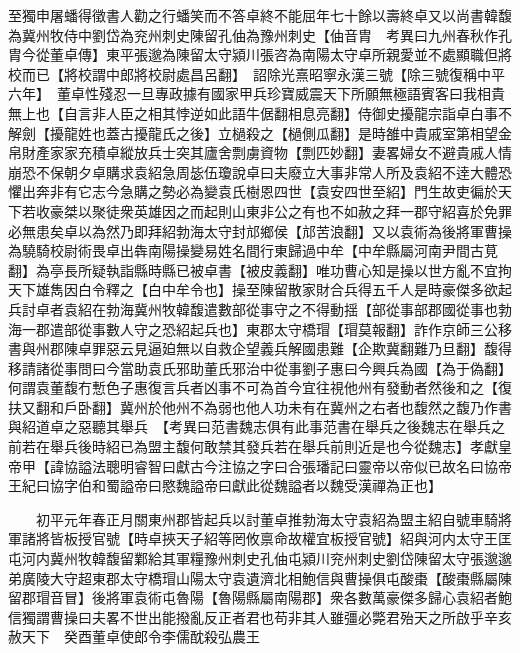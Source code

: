 至獨申屠蟠得徵書人勸之行蟠笑而不答卓終不能屈年七十餘以壽終卓又以尚書韓馥為冀州牧侍中劉岱為兖州刺史陳留孔伷為豫州刺史【伷音胄　考異曰九州春秋作孔胄今從董卓傳】東平張邈為陳留太守潁川張咨為南陽太守卓所親愛並不處顯職但將校而已【將校謂中郎將校尉處昌呂翻】　詔除光熹昭寧永漢三號【除三號復稱中平六年】　董卓性殘忍一旦專政據有國家甲兵珍寶威震天下所願無極語賓客曰我相貴無上也【自言非人臣之相其悖逆如此語牛倨翻相息亮翻】侍御史擾龍宗詣卓白事不解劍【擾龍姓也蓋古擾龍氏之後】立檛殺之【檛側瓜翻】是時雒中貴戚室第相望金帛財產家家充積卓縱放兵士突其廬舍剽虜資物【剽匹妙翻】妻畧婦女不避貴戚人情崩恐不保朝夕卓購求袁紹急周毖伍瓊說卓曰夫廢立大事非常人所及袁紹不逹大體恐懼出奔非有它志今急購之勢必為變袁氏樹恩四世【袁安四世至紹】門生故吏徧於天下若收豪桀以聚徒衆英雄因之而起則山東非公之有也不如赦之拜一郡守紹喜於免罪必無患矣卓以為然乃即拜紹勃海太守封邟鄉侯【邟苦浪翻】又以袁術為後將軍曹操為驍騎校尉術畏卓出犇南陽操變易姓名間行東歸過中牟【中牟縣屬河南尹間古莧翻】為亭長所疑執詣縣時縣已被卓書【被皮義翻】唯功曹心知是操以世方亂不宜拘天下雄雋因白令釋之【白中牟令也】操至陳留散家財合兵得五千人是時豪傑多欲起兵討卓者袁紹在勃海冀州牧韓馥遣數部從事守之不得動揺【部從事部郡國從事也勃海一郡遣部從事數人守之恐紹起兵也】東郡太守橋瑁【瑁莫報翻】詐作京師三公移書與州郡陳卓罪惡云見逼廹無以自救企望義兵解國患難【企欺冀翻難乃旦翻】馥得移請諸從事問曰今當助袁氏邪助董氏邪治中從事劉子惠曰今興兵為國【為于偽翻】何謂袁董馥冇慙色子惠復言兵者凶事不可為首今宜往視他州有發動者然後和之【復扶又翻和戶卧翻】冀州於他州不為弱也他人功未有在冀州之右者也馥然之馥乃作書與紹道卓之惡聽其舉兵　【考異曰范書魏志俱有此事范書在舉兵之後魏志在舉兵之前若在舉兵後時紹已為盟主馥何敢禁其發兵若在舉兵前則近是也今從魏志】孝獻皇帝甲【諱協謚法聰明睿智曰獻古今注協之字曰合張璠記曰靈帝以帝似已故名曰協帝王紀曰協字伯和蜀謚帝曰愍魏謚帝曰獻此從魏謚者以魏受漢禪為正也】

　　初平元年春正月關東州郡皆起兵以討董卓推勃海太守袁紹為盟主紹自號車騎將軍諸將皆板授官號【時卓挾天子紹等罔攸禀命故權宜板授官號】紹與河内太守王匡屯河内冀州牧韓馥留鄴給其軍糧豫州刺史孔伷屯潁川兖州刺史劉岱陳留太守張邈邈弟廣陵大守超東郡太守橋瑁山陽太守袁遺濟北相鮑信與曹操俱屯酸棗【酸棗縣屬陳留郡瑁音冒】後將軍袁術屯魯陽【魯陽縣屬南陽郡】衆各數萬豪傑多歸心袁紹者鮑信獨謂曹操曰夫畧不世出能撥亂反正者君也苟非其人雖彊必斃君殆天之所啟乎辛亥赦天下　癸酉董卓使郎令李儒酖殺弘農王

